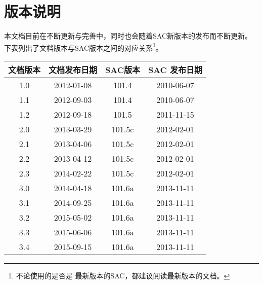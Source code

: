 {\section*{版本说明}}

本文档目前在不断更新与完善中，同时也会随着SAC新版本的发布而不断更新。
下表列出了文档版本与SAC版本之间的对应关系\footnote{不论使用的是否是
最新版本的SAC，都建议阅读最新版本的文档。}。

\begin{table}[H]
\centering
\begin{tabular}{cccc}
\toprule
文档版本	& 	文档发布日期 	& 	SAC版本 &	SAC 发布日期\\
\midrule
1.0  			&	2012-01-08		&	101.4	&	2010-06-07	\\
1.1  			&	2012-09-03		&	101.4	&	2010-06-07	\\
1.2  			&	2012-09-18		&	101.5	&	2011-11-15	\\
2.0  			&	2013-03-29		&	101.5c	&	2012-02-01	\\
2.1  			&	2013-04-06		&	101.5c	&	2012-02-01	\\
2.2  			&	2013-04-12		&	101.5c	&	2012-02-01	\\
2.3             &   2014-02-22      &   101.5c  &   2012-02-01  \\
3.0             &   2014-04-18      &   101.6a  &   2013-11-11  \\
3.1             &   2014-09-25      &   101.6a  &   2013-11-11  \\
3.2             &   2015-05-02      &   101.6a  &   2013-11-11  \\
3.3             &   2015-06-06      &   101.6a  &   2013-11-11  \\
3.4             &   2015-09-15      &   101.6a  &   2013-11-11  \\
\bottomrule
\end{tabular}
\end{table}
